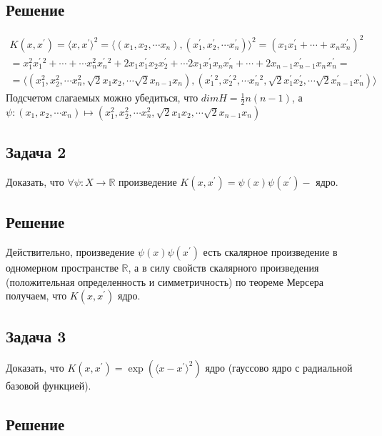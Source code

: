\subsection{Решение}
\begin{align*}
K(x, x^{\prime}) = \langle x, x^{\prime} \rangle^2 = \langle (x_1, x_2, \cdots x_n), (x_1^{\prime}, x_2^{\prime}, \cdots x_n^{\prime}) \rangle^2 = (x_1x_1^{\prime} + \cdots + x_nx_n^{\prime})^2  \\
  = x_1^2x_1^{\prime}^2 + \cdots + \cdots x_n^2x_n^{\prime}^2 + 2x_1x_1^{\prime}x_2x_2^{\prime} + \cdots 2x_1x_1^{\prime}x_{n}x_n^{\prime} + \cdots + 2x_{n-1}x_{n-1}^{\prime}x_{n}x_{n}^{\prime}  = \\
  = \langle(x_1^2, x_2^2, \cdots x_n^2, \sqrt{2}x_1x_2, \cdots \sqrt{2}x_{n-1}x_n),(x_1^{\prime}^2, x_2^{\prime}^2, \cdots x_n^{\prime}^2, \sqrt{2}x_1^{\prime}x_2^{\prime},\cdots \sqrt{2}x_{n-1}^{\prime}x_{n}^{\prime})\rangle
\end{align*}
Подсчетом слагаемых можно убедиться, что $ dimH = \frac{1}{2}n(n-1) $, а $\psi:(x_1, x_2, \cdots x_n) \mapsto(x_1^2, x_2^2, \cdots x_n^2, \sqrt{2}x_1x_2, \cdots \sqrt{2}x_{n-1}x_n)$

\subsection{Задача 2}
Доказать, что $\forall \psi: X \rightarrow \mathbb{R}$ произведение $K\left(x, x^{\prime}\right)=\psi(x) \psi\left(x^{\prime}\right)-$ ядро.
\subsection{Решение}

Действительно, произведение $\psi(x) \psi(x^{\prime})$ есть скалярное произведение в одномерном пространстве $\mathbb{R}$, а в силу свойств скалярного произведения
(положительная определенность и симметричность) по теореме Мерсера получаем, что $K(x, x^{\prime})$ ядро.

\subsection{Задача 3}
Доказать, что $K(x, x^{\prime})=\exp(\langle x - x^{\prime} \rangle^2)$ ядро (гауссово ядро с радиальной базовой функцией).
\subsection{Решение}

